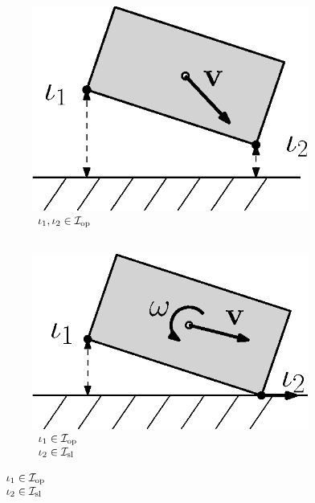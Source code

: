 \documentclass[../DC2019003Bouma.tex]{subfiles}
\begin{document}
\begin{figure}[bt!]
\centering
\begin{subfigure}[b]{0.17\textwidth}
\centering
\includegraphics[width=\textwidth]{example1.eps}
\caption{$\begin{array}{l}
\iota_1,\iota_2\in\mathcal{I}_{\textnormal{op}}\\ \hspace{0cm}
\end{array}$}
\label{fig:2example1}
\end{subfigure}
\quad
\begin{subfigure}[b]{0.17\textwidth}  
\centering 
\includegraphics[width=\textwidth]{example2.eps}
\caption{$\begin{array}{l}
\iota_1\in\mathcal{I}_{\textnormal{op}}\\\iota_2\in\mathcal{I}_{\textnormal{sl}}
\end{array}$}
\label{fig:2example2}

\end{subfigure}
\end{figure}
\end{document}
